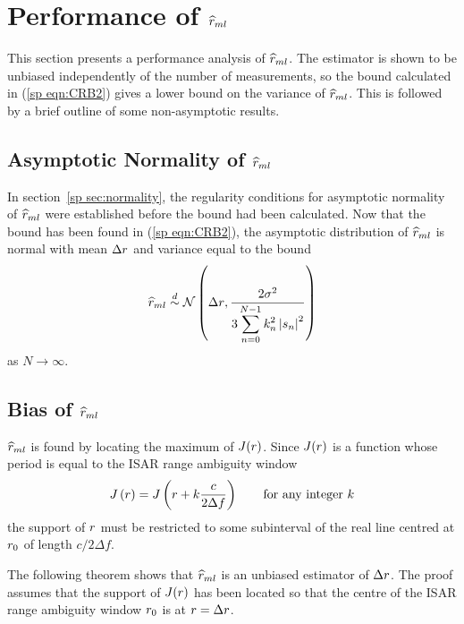 \section{Performance of $\widehat{r}_{ml}$}

This section presents a performance analysis of $\widehat{r}_{ml}$.  The estimator is
shown to be unbiased independently of the number of measurements, so the \CR
bound calculated in (\ref{sp eqn:CRB2}) gives a lower bound on the variance
of $\widehat{r}_{ml}$.  This is followed by a brief outline of some non-asymptotic
results.

\subsection{Asymptotic Normality of $\widehat{r}_{ml}$}

In section~\ref{sp sec:normality}, the regularity conditions for asymptotic 
normality of $\widehat{r}_{ml}$ were established before the \CR bound had been
calculated.  Now that the \CR bound has been found in (\ref{sp eqn:CRB2}),
the asymptotic distribution of $\widehat{r}_{ml}$ is normal with mean ${\Delta r}$ and variance
equal to the \CR bound
\begin{equation}
\widehat{r}_{ml}\stackrel{d}{\sim}{\cal N}\left({\Delta r},
\frac{2{\sigma^2}}{3\displaystyle\sum_{n=0}^{N-1}k_n^2\left|s_n\right|^2}\right)
\end{equation}
as $N\to\infty$.

\subsection{Bias of $\widehat{r}_{ml}$}

$\widehat{r}_{ml}$ is found by locating the maximum of $J({r})$.  Since $J({r})$ is a
function whose period is equal to the ISAR range ambiguity window
\begin{equation}
J\left({r}\right)=J\left({r}+k\frac{c}{2\Delta f}\right)
\qquad\mbox{for any integer $k$}
\end{equation}
the support of ${r}$ must be restricted to some subinterval of the real line
centred at ${r}_0$ of length $c/2\Delta f$.  

The following theorem shows that $\widehat{r}_{ml}$ is an unbiased estimator of ${\Delta r}$.  
The proof assumes that the support of $J({r})$ has been located so that the
centre of the ISAR range ambiguity window ${r}_0$ is at ${r}={\Delta r}$.  

